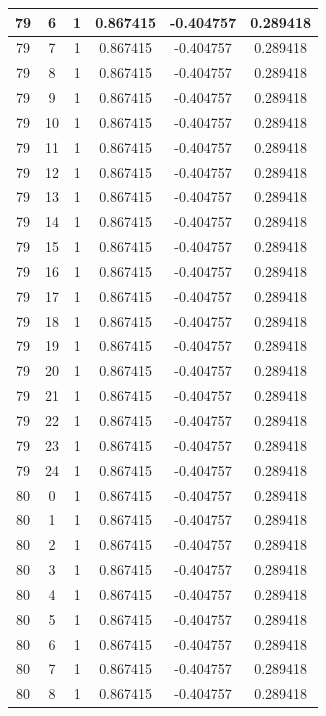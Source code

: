 \documentclass[12pt,a4paper]{article}
\numberwithin{equation}{section}
\numberwithin{figure}{section}
\numberwithin{table}{section}
\begin{document}
\begin{longtable}{|c|c|c|c|c|c|}
79 & 6 & 1 & 0.867415 & -0.404757 & 0.289418 \\ \hline
79 & 7 & 1 & 0.867415 & -0.404757 & 0.289418 \\ \hline
79 & 8 & 1 & 0.867415 & -0.404757 & 0.289418 \\ \hline
79 & 9 & 1 & 0.867415 & -0.404757 & 0.289418 \\ \hline
79 & 10 & 1 & 0.867415 & -0.404757 & 0.289418 \\ \hline
79 & 11 & 1 & 0.867415 & -0.404757 & 0.289418 \\ \hline
79 & 12 & 1 & 0.867415 & -0.404757 & 0.289418 \\ \hline
79 & 13 & 1 & 0.867415 & -0.404757 & 0.289418 \\ \hline
79 & 14 & 1 & 0.867415 & -0.404757 & 0.289418 \\ \hline
79 & 15 & 1 & 0.867415 & -0.404757 & 0.289418 \\ \hline
79 & 16 & 1 & 0.867415 & -0.404757 & 0.289418 \\ \hline
79 & 17 & 1 & 0.867415 & -0.404757 & 0.289418 \\ \hline
79 & 18 & 1 & 0.867415 & -0.404757 & 0.289418 \\ \hline
79 & 19 & 1 & 0.867415 & -0.404757 & 0.289418 \\ \hline
79 & 20 & 1 & 0.867415 & -0.404757 & 0.289418 \\ \hline
79 & 21 & 1 & 0.867415 & -0.404757 & 0.289418 \\ \hline
79 & 22 & 1 & 0.867415 & -0.404757 & 0.289418 \\ \hline
79 & 23 & 1 & 0.867415 & -0.404757 & 0.289418 \\ \hline
79 & 24 & 1 & 0.867415 & -0.404757 & 0.289418 \\ \hline
80 & 0 & 1 & 0.867415 & -0.404757 & 0.289418 \\ \hline
80 & 1 & 1 & 0.867415 & -0.404757 & 0.289418 \\ \hline
80 & 2 & 1 & 0.867415 & -0.404757 & 0.289418 \\ \hline
80 & 3 & 1 & 0.867415 & -0.404757 & 0.289418 \\ \hline
80 & 4 & 1 & 0.867415 & -0.404757 & 0.289418 \\ \hline
80 & 5 & 1 & 0.867415 & -0.404757 & 0.289418 \\ \hline
80 & 6 & 1 & 0.867415 & -0.404757 & 0.289418 \\ \hline
80 & 7 & 1 & 0.867415 & -0.404757 & 0.289418 \\ \hline
80 & 8 & 1 & 0.867415 & -0.404757 & 0.289418 \\ \hline

\end{longtable}
\end{document}
